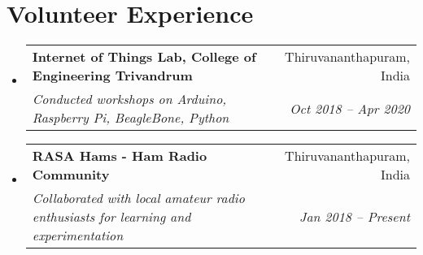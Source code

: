 \documentclass[a4paper,20pt]{article}
\makeatletter
\newcommand{\resumeSubheading}[4]{
  \vspace{-1pt}\item
  \begin{tabular*}{0.97\textwidth}{l@{\extracolsep{\fill}}r}
    \textbf{#1} & #2 \\
    \textit{#3} & \textit{#4} \\
  \end{tabular*}\vspace{-5pt}
}
\newcommand{\resumeSubHeadingListStart}{\begin{itemize}[leftmargin=*]}
\newcommand{\resumeSubHeadingListEnd}{\end{itemize}}
\makeatother
\begin{document}
\vspace{+5pt}
\section{Volunteer Experience}
\resumeSubHeadingListStart
    \resumeSubheading
        {Internet of Things Lab, College of Engineering Trivandrum}{Thiruvananthapuram, India}
        {Conducted workshops on Arduino, Raspberry Pi, BeagleBone, Python}{Oct 2018 -- Apr 2020}
    \resumeSubheading
        {RASA Hams - Ham Radio Community}{Thiruvananthapuram, India}
        {Collaborated with local amateur radio enthusiasts for learning and experimentation}{Jan 2018 -- Present}
    \resumeSubHeadingListEnd
\end{document}
